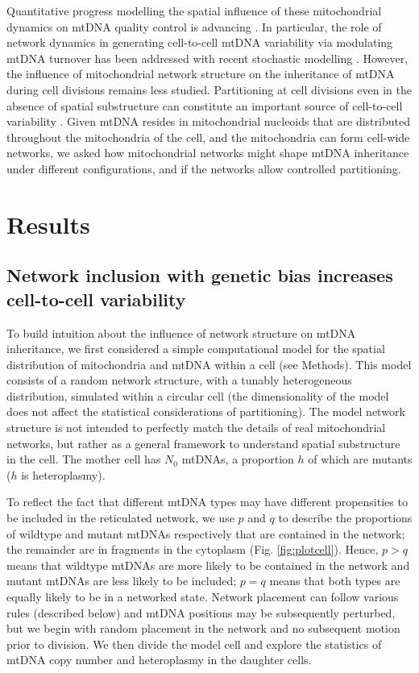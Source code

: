 \documentclass{article}
\begin{document}
Quantitative progress modelling the spatial influence of these mitochondrial dynamics on mtDNA quality control is advancing \citep{mouli2009frequency, tam2013mathematical, patel2013optimal, tam2015context,figge2012deceleration}. In particular, the role of network dynamics in generating cell-to-cell mtDNA variability via modulating mtDNA turnover has been addressed with recent stochastic modelling \cite{aryaman2019mitochondrial}. However, the influence of mitochondrial network structure on the inheritance of mtDNA during cell divisions remains less studied. Partitioning at cell divisions even in the absence of spatial substructure can constitute an important source of cell-to-cell variability \citep{huh2011non, johnston2015closed}. Given mtDNA resides in mitochondrial nucleoids \citep{ilamathi2021new} that are distributed throughout the mitochondria of the cell, and the mitochondria can form cell-wide networks, we asked how mitochondrial networks might shape mtDNA inheritance under different configurations, and if the networks allow controlled partitioning.

\section{Results}
\subsection{Network inclusion with genetic bias increases cell-to-cell variability}
To build intuition about the influence of network structure on mtDNA inheritance, we first considered a simple computational model for the spatial distribution of mitochondria and mtDNA within a cell (see Methods). This model consists of a random network structure, with a tunably heterogeneous distribution, simulated within a circular cell (the dimensionality of the model does not affect the statistical considerations of partitioning). The model network structure is not intended to perfectly match the details of real mitochondrial networks, but rather as a general framework to understand spatial substructure in the cell. The mother cell has $N_0$ mtDNAs, a proportion $h$ of which are mutants ($h$ is heteroplasmy). 

To reflect the fact that different mtDNA types may have different propensities to be included in the reticulated network, we use $p$ and $q$ to describe the proportions of wildtype and mutant mtDNAs respectively that are contained in the network; the remainder are in fragments in the cytoplasm (Fig. \ref{fig:plotcell}). Hence, $p > q$ means that wildtype mtDNAs are more likely to be contained in the network and mutant mtDNAs are less likely to be included; $p=q$ means that both types are equally likely to be in a networked state. Network placement can follow various rules (described below) and mtDNA positions may be subsequently perturbed, but we begin with random placement in the network and no subsequent motion prior to division. We then divide the model cell and explore the statistics of mtDNA copy number and heteroplasmy in the daughter cells.
\end{document}
